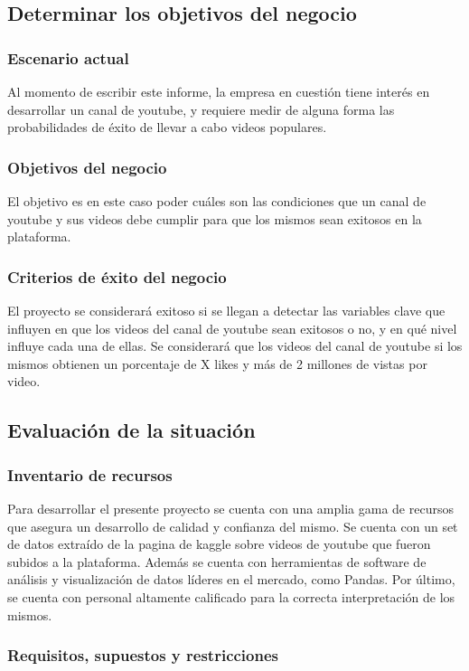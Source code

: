 \subsection{Determinar los objetivos del negocio}
    \subsubsection{Escenario actual}
    Al momento de escribir este informe, la empresa en cuestión tiene interés
    en desarrollar un canal de youtube, y requiere medir de alguna forma las
    probabilidades de éxito de llevar a cabo videos populares.
    \subsubsection{Objetivos del negocio}
    El objetivo es en este caso poder  cuáles son las condiciones que un canal
    de youtube y sus videos debe cumplir para que los mismos sean exitosos en
    la plataforma.
    \subsubsection{Criterios de éxito del negocio}
    El proyecto se considerará exitoso si se llegan a detectar las variables
    clave que influyen en que los videos del canal de youtube sean exitosos o
    no, y en qué nivel influye cada una de ellas. Se considerará que los videos
    del canal de youtube si los mismos obtienen un porcentaje de X likes y más
    de 2 millones de vistas por video.

\subsection{Evaluación de la situación}
    \subsubsection{Inventario de recursos}
    Para desarrollar el presente proyecto se cuenta con una amplia gama de recursos que
    asegura un desarrollo de calidad y confianza del mismo.
    Se cuenta con un set de datos extraído de la pagina de kaggle sobre videos
    de youtube que fueron subidos a la plataforma. Además se cuenta con
    herramientas de software de análisis y visualización de datos líderes
    en el mercado, como Pandas. Por último, se cuenta con personal
    altamente calificado para la correcta interpretación de los mismos.

    \subsubsection{Requisitos, supuestos y restricciones}
